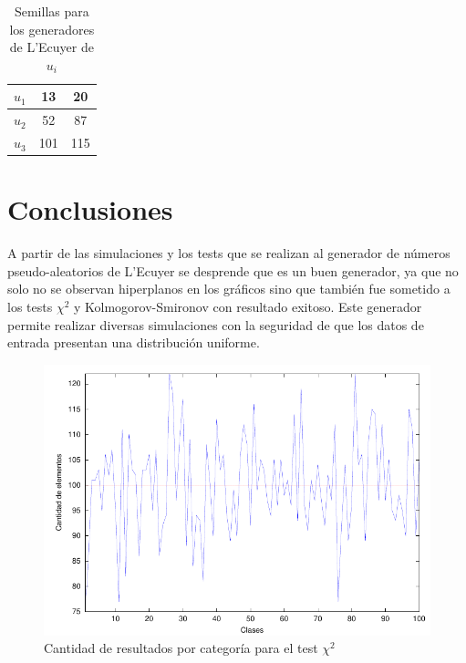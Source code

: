 \documentclass{sig-alternate}
\begin{document}
\begin{table}[h]
\label{seeds}
\centering
\begin{tabular}{|c|c|c|}
\hline
 $u_1$ & 13 & 20 \\
\hline
 $u_2$ & 52 & 87 \\
\hline
 $u_3$ & 101 & 115 \\
\hline
\end{tabular}
\caption{Semillas para los generadores de L'Ecuyer de $u_i$}
\end{table}


\section{Conclusiones}\label{conclusiones}

A partir de las simulaciones y los tests que se realizan al generador de n\'{u}meros 
pseudo-aleatorios de L'Ecuyer se desprende que es un buen generador, ya que no solo no 
se observan hiperplanos en los gr\'{a}ficos sino que tambi\'{e}n fue sometido a
los tests $\chi^{2}$ y Kolmogorov-Smironov con resultado exitoso. Este generador
permite realizar diversas simulaciones con la seguridad de que los datos de
entrada presentan una distribuci\'{o}n uniforme.

\begin{figure}[hp]
\centering
\includegraphics[scale=0.8]{graficos/clases}
\caption{Cantidad de resultados por categor\'{i}a para el test $\chi^{2}$}
\label{fig:clases}
\end{figure}
\end{document}
